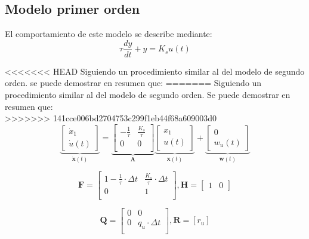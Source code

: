 \documentclass[conference]{IEEEtran}
\begin{document}
\subsection{Modelo primer orden}

El comportamiento de este modelo se describe mediante:
\[
\tau \frac{dy}{dt} + y = K_s u(t)
\]

<<<<<<< HEAD
Siguiendo un procedimiento similar al del modelo de segundo orden. se puede demostrar en resumen que:
=======
Siguiendo un procedimiento similar al del modelo de segundo orden. Se puede demostrar en resumen que:\\

>>>>>>> 141cce006bd2704753c299f1eb44f68a609003d0
\begin{equation*}
	\underbrace{
		\begin{bmatrix}
			\dot{x}_1 \\
			\dot{u}(t)
		\end{bmatrix}
	}_{\mathbf{\dot{x}}(t)}
	=
	\underbrace{\begin{bmatrix}
			-\frac{1}{\tau}           & \frac{K_s}{\tau}                 \\
			0 & 0   \\
	\end{bmatrix}}_{\mathbf{A}}
	\underbrace{\begin{bmatrix}
			x_1 \\
			u(t) 
	\end{bmatrix}}_{\mathbf{x}(t)}	
	+
	\underbrace{
		\begin{bmatrix}
			0 \\
			w_{u}(t)
		\end{bmatrix}
	}_{\mathbf{w}(t)}
\end{equation*}

\[
	\mathbf{F} = \begin{bmatrix}
		1 -\frac{1}{\tau} \cdot \Delta t          & \frac{K_s}{\tau} \cdot \Delta t               \\
		0 & 1 \\
	\end{bmatrix},
	\mathbf{H} =
	\begin{bmatrix}
		1 & 0
	\end{bmatrix}
\]

\[
\mathbf{Q} = \begin{bmatrix}
	0 & 0  \\
	0 & q_u \cdot \Delta t \\
\end{bmatrix}, 
\mathbf{R} = [r_u]
\]
\end{document}
